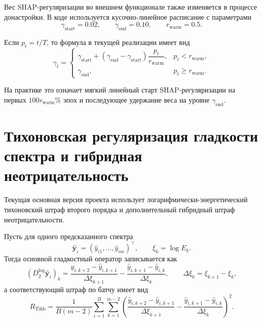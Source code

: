 \documentclass[11pt]{article}
\begin{document}
Вес SHAP-регуляризации во внешнем функционале также изменяется в процессе донастройки. В коде используется кусочно-линейное расписание с параметрами
\begin{equation}
\gamma_{\mathrm{start}} = 0.02,
\qquad
\gamma_{\mathrm{end}} = 0.10,
\qquad
r_{\mathrm{warm}} = 0.5.
\end{equation}

Если $p_t = t/T$, то формула в текущей реализации имеет вид
\begin{equation}
\gamma_t =
\begin{cases}
\gamma_{\mathrm{start}} + (\gamma_{\mathrm{end}} - \gamma_{\mathrm{start}})\dfrac{p_t}{r_{\mathrm{warm}}}, & p_t < r_{\mathrm{warm}},\\[8pt]
\gamma_{\mathrm{end}}, & p_t \ge r_{\mathrm{warm}}.
\end{cases}
\end{equation}

На практике это означает мягкий линейный старт SHAP-регуляризации на первых $100r_{\mathrm{warm}}\%$ эпох и последующее удержание веса на уровне $\gamma_{\mathrm{end}}$.

\section{Тихоновская регуляризация гладкости спектра и гибридная неотрицательность}

Текущая основная версия проекта использует логарифмически-энергетический тихоновский штраф второго порядка и дополнительный гибридный штраф неотрицательности.

Пусть для одного предсказанного спектра
\begin{equation}
\hat{\mathbf{y}}_i = (\hat{y}_{i1},\dots,\hat{y}_{im})^\top,
\qquad
\xi_k = \log E_k.
\end{equation}
Тогда основной гладкостный оператор записывается как
\begin{equation}
\left(D^{\log}_2\hat{\mathbf{y}}_i\right)_k =
\frac{\hat{y}_{i,k+2}-\hat{y}_{i,k+1}}{\Delta \xi_{k+1}}
-
\frac{\hat{y}_{i,k+1}-\hat{y}_{i,k}}{\Delta \xi_k},
\qquad
\Delta \xi_k = \xi_{k+1}-\xi_k,
\end{equation}
а соответствующий штраф по батчу имеет вид
\begin{equation}
R_{\mathrm{Tikh}} = \frac{1}{B(m-2)} \sum_{i=1}^{B} \sum_{k=1}^{m-2}
\left(
\frac{\hat{y}_{i,k+2}-\hat{y}_{i,k+1}}{\Delta \xi_{k+1}}
-
\frac{\hat{y}_{i,k+1}-\hat{y}_{i,k}}{\Delta \xi_k}
\right)^2.
\end{equation}
\end{document}
